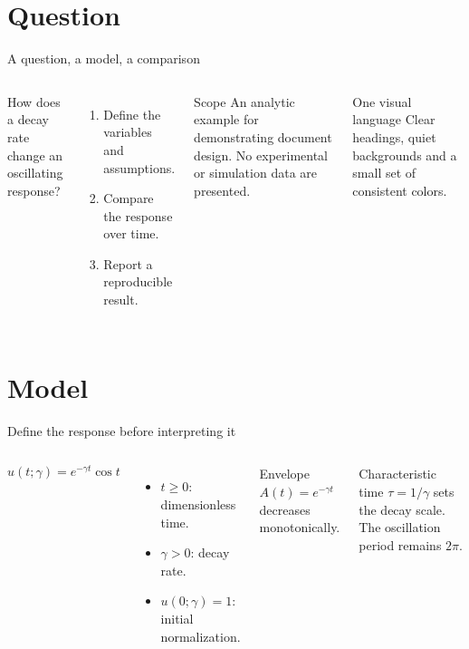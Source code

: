 \section{Question}
\begin{frame}{A question, a model, a comparison}
  \begin{columns}[T,onlytextwidth]
    {\Large How does a decay rate\\change an oscillating response?}\par
    \vspace{6mm}
    \begin{enumerate}
      \item Define the variables and assumptions.
      \item Compare the response over time.
      \item Report a reproducible result.
    \end{enumerate}
    \begin{block}{Scope}
      An analytic example for demonstrating document design. No experimental
      or simulation data are presented.
    \end{block}
    \begin{exampleblock}{One visual language}
      Clear headings, quiet backgrounds and a small set of consistent colors.
    \end{exampleblock}
  \end{columns}
\end{frame}

\section{Model}
\begin{frame}{Define the response before interpreting it}
  \begin{columns}[T,onlytextwidth]
    \begin{equation*}
      \boxed{u(t;\gamma)=e^{-\gamma t}\cos t}
    \end{equation*}
    \vspace{4mm}
    \begin{itemize}
      \item $t\geq0$: dimensionless time.
      \item $\gamma>0$: decay rate.
      \item $u(0;\gamma)=1$: initial normalization.
    \end{itemize}
    \begin{block}{Envelope}
      $A(t)=e^{-\gamma t}$ decreases monotonically.
    \end{block}
    \begin{alertblock}{Characteristic time}
      $\tau=1/\gamma$ sets the decay scale.
      The oscillation period remains $2\pi$.
    \end{alertblock}
  \end{columns}
\end{frame}

